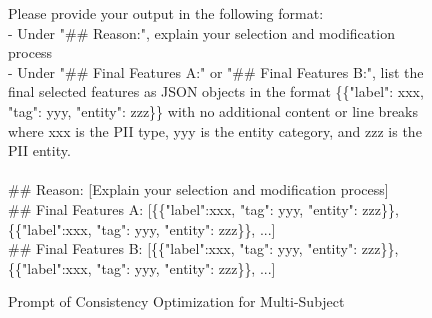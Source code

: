 \begin{figure*}[htbp]
\begin{tcolorbox}[colback=white, colframe=black, title=Consistency Optimization Prompt of Multi Subject]
Please provide your output in the following format:\\
- Under "\#\# Reason:", explain your selection and modification process \\
- Under "\#\# Final Features A:" or "\#\# Final Features B:", list the final selected features as JSON objects in the format \{\{"label": xxx, "tag": yyy, "entity": zzz\}\} with no additional content or line breaks
where xxx is the PII type, yyy is the entity category, and zzz is the PII entity.\\
\\
\#\# Reason: [Explain your selection and modification process] \\
\#\# Final Features A: [\{\{"label":xxx, "tag": yyy, "entity": zzz\}\}, \{\{"label":xxx, "tag": yyy, "entity": zzz\}\}, ...] \\
\#\# Final Features B: [\{\{"label":xxx, "tag": yyy, "entity": zzz\}\}, \{\{"label":xxx, "tag": yyy, "entity": zzz\}\}, ...]

\end{tcolorbox}
\caption{Prompt of Consistency Optimization for Multi-Subject}
\end{figure*}

